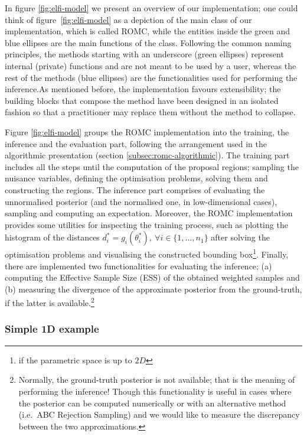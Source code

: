 In figure \ref{fig:elfi-model} we present an overview of our
implementation; one could think of figure~\ref{fig:elfi-model} as a
depiction of the main class of our implementation, which is called
ROMC, while the entities inside the green and blue ellipses are the
main functions of the class. Following the common naming principles,
the methods starting with an underscore (green ellipses) represent
internal (private) functions and are not meant to be used by a user,
whereas the rest of the methods (blue ellipses) are the
functionalities used for performing the inference.As mentioned before,
the implementation favours extensibility; the building blocks that
compose the method have been designed in an isolated fashion so that a
practitioner may replace them without the method to collapse.

Figure \ref{fig:elfi-model} groups the ROMC implementation into the
training, the inference and the evaluation part, following the
arrangement used in the algorithmic presentation (section
\ref{subsec:romc-algorithmic}). The training part includes all the
steps until the computation of the proposal regions; sampling the
nuisance variables, defining the optimisation problems, solving them
and constructing the regions. The inference part comprises of
evaluating the unnormalised posterior (and the normalised one, in
low-dimensional cases), sampling and computing an
expectation. Moreover, the ROMC implementation provides some utilities
for inspecting the training process, such as plotting the histogram of
the distances
$d^*_i = g_i(\theta_i^*), \: \forall i \in \{1, \ldots, n_1
\}$ after solving the optimisation problems and visualising the
constructed bounding box\footnote{if the parametric space is up to
  $2D$}. Finally, there are implemented two functionalities for
evaluating the inference; (a) computing the Effective Sample Size
(ESS) of the obtained weighted samples and (b) measuring the
divergence of the approximate posterior from the ground-truth, if the
latter is available.\footnote{Normally, the ground-truth posterior is
  not available; that is the meaning of performing the inference!
  Though this functionality is useful in cases where the posterior can
  be computed numerically or with an alternative method (i.e.\ ABC
  Rejection Sampling) and we would like to measure the discrepancy
  between the two approximations.}


\subsubsection*{Simple 1D example}

